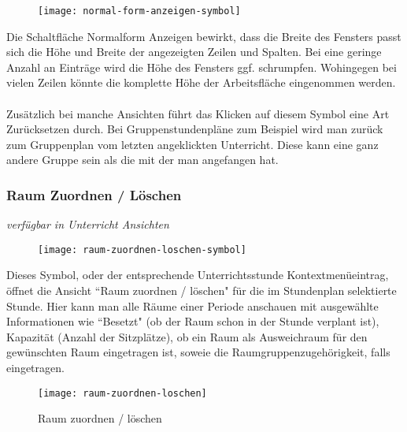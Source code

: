\begin{wrapfigure}{r}{.05\textwidth}
	\vspace{-50pt}
	\texttt{[image: normal-form-anzeigen-symbol]}
	\vspace{-35pt}
\end{wrapfigure}

\noindent
Die Schaltfläche Normalform Anzeigen bewirkt, dass die Breite des Fensters passt sich die Höhe und Breite der angezeigten Zeilen und Spalten. Bei eine geringe Anzahl an Einträge wird die Höhe des Fensters ggf. schrumpfen. Wohingegen bei vielen Zeilen könnte die komplette Höhe der Arbeitsfläche eingenommen werden.\\
\\
Zusätzlich bei manche Ansichten führt das Klicken auf diesem Symbol eine Art Zurücksetzen durch. Bei Gruppenstundenpläne zum Beispiel wird man zurück zum Gruppenplan vom letzten angeklickten Unterricht. Diese kann eine ganz andere Gruppe sein als die mit der man angefangen hat.\\

\subsubsection{Raum Zuordnen / Löschen}
{\small\textit{verfügbar in Unterricht Ansichten\\}\par}

\begin{wrapfigure}{r}{.05\textwidth}
	\vspace{-50pt}
	\texttt{[image: raum-zuordnen-loschen-symbol]}
	\vspace{-35pt}
\end{wrapfigure}

\noindent
Dieses Symbol, oder der entsprechende Unterrichtsstunde Kontextmenüeintrag, öffnet die Ansicht ``Raum zuordnen / löschen" für die im Stundenplan selektierte Stunde. Hier kann man alle Räume einer Periode anschauen mit ausgewählte Informationen wie ``Besetzt" (ob der Raum schon in der Stunde verplant ist), Kapazität (Anzahl der Sitzplätze), ob ein Raum als Ausweichraum für den gewünschten Raum eingetragen ist, soweie die Raumgruppenzugehörigkeit, falls eingetragen.\\

\begin{wrapfigure}{r}{0.3\textwidth}
	\texttt{[image: raum-zuordnen-loschen]}
	\vspace{-15pt}
	\caption{Raum zuordnen / löschen}
	\label{fig:raum-zuordnen-loschen}
\end{wrapfigure}

